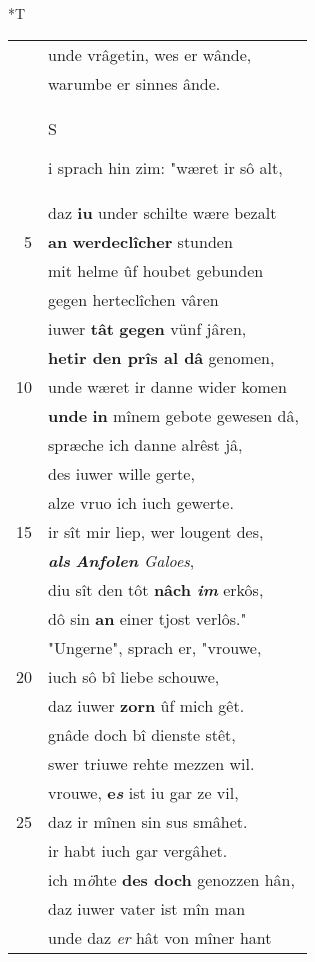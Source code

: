 \documentclass[8pt,a4paper,notitlepage]{article}
\begin{document}
\begin{table}[ht]
\begin{minipage}[t]{0.5\linewidth}
\small
\begin{center}*T
\end{center}
\begin{tabular}{rl}
 & unde vrâgetin, wes er wânde,\\ 
 & warumbe er sinnes ânde.\\ 
 & \begin{large}S\end{large}i sprach hin zim: "wæret ir sô alt,\\ 
 & daz \textbf{iu} under schilte wære bezalt\\ 
5 & \textbf{an} \textbf{werdeclîcher} stunden\\ 
 & mit helme ûf houbet gebunden\\ 
 & gegen herteclîchen vâren\\ 
 & iuwer \textbf{tât} \textbf{gegen} vünf jâren,\\ 
 & \textbf{hetir den prîs al dâ} genomen,\\ 
10 & unde wæret ir danne wider komen\\ 
 & \textbf{unde} \textbf{in} mînem gebote gewesen dâ,\\ 
 & spræche ich danne alrêst jâ,\\ 
 & des iuwer wille gerte,\\ 
 & alze vruo ich iuch gewerte.\\ 
15 & ir sît mir liep, wer lougent des,\\ 
 & \textit{\textbf{als}} \textit{\textbf{Anfolen} Galoes},\\ 
 & diu sît den tôt \textbf{nâch \textit{im}} erkôs,\\ 
 & dô sin \textbf{an} einer tjost verlôs."\\ 
 & "Ungerne", sprach er, "vrouwe,\\ 
20 & iuch sô bî liebe schouwe,\\ 
 & daz iuwer \textbf{zorn} ûf mich gêt.\\ 
 & gnâde doch bî dienste stêt,\\ 
 & swer triuwe rehte mezzen wil.\\ 
 & vrouwe, \textbf{e\textit{s}} ist iu gar ze vil,\\ 
25 & daz ir mînen sin sus smâhet.\\ 
 & ir habt iuch gar vergâhet.\\ 
 & ich m\textit{ö}hte \textbf{des doch} genozzen hân,\\ 
 & daz iuwer vater ist mîn man\\ 
 & unde daz \textit{er} hât von mîner hant\\ 

\end{tabular}
\end{minipage}
\end{table}
\end{document}
